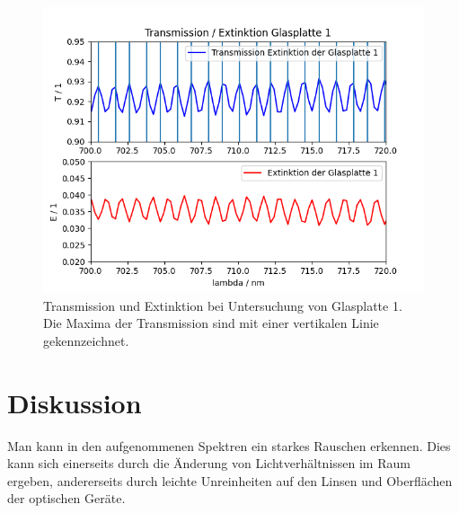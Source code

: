 \documentclass{article}
\begin{document}
\begin{figure}[H]
\centering
\caption{Transmission und Extinktion bei Untersuchung von Glasplatte 1. Die Maxima der Transmission sind mit einer vertikalen Linie gekennzeichnet.}
\label{fig:GP1_ET}
\includegraphics[scale=0.7]{GP1_ET.png}
\end{figure}







\section{Diskussion}

Man kann in den aufgenommenen Spektren ein starkes Rauschen erkennen. Dies kann sich einerseits durch die Änderung von Lichtverhältnissen im Raum ergeben, andererseits durch leichte Unreinheiten auf den Linsen und Oberflächen der optischen Geräte.

\end{document}
